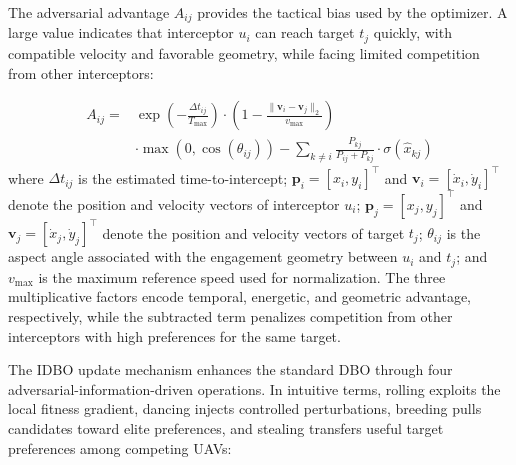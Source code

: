 \documentclass[lettersize,journal]{IEEEtran}
\begin{document}
The adversarial advantage $A_{ij}$ provides the tactical bias used by the optimizer. A large value indicates that interceptor $u_i$ can reach target $t_j$ quickly, with compatible velocity and favorable geometry, while facing limited competition from other interceptors:

\begin{equation}
\label{eq:adversarial_advantage}
\begin{split}
A_{ij} =& \exp\left(-\frac{\Delta t_{ij}}{T_{\max}}\right) \cdot \left(1 - \frac{\|\mathbf{v}_i - \mathbf{v}_j\|_2}{v_{\max}}\right) \\
&\cdot \max\left(0, \cos(\theta_{ij})\right) - \sum_{k\neq i} \frac{P_{kj}}{P_{ij} + P_{kj}} \cdot \sigma(\hat{x}_{kj})
\end{split}
\end{equation}
where $\Delta t_{ij}$ is the estimated time-to-intercept; $\mathbf{p}_i=[x_i, y_i]^\top$ and $\mathbf{v}_i=[\dot{x}_i, \dot{y}_i]^\top$ denote the position and velocity vectors of interceptor $u_i$; $\mathbf{p}_j=[x_j, y_j]^\top$ and $\mathbf{v}_j=[\dot{x}_j, \dot{y}_j]^\top$ denote the position and velocity vectors of target $t_j$; $\theta_{ij}$ is the aspect angle associated with the engagement geometry between $u_i$ and $t_j$; and $v_{\max}$ is the maximum reference speed used for normalization. The three multiplicative factors encode temporal, energetic, and geometric advantage, respectively, while the subtracted term penalizes competition from other interceptors with high preferences for the same target.

The IDBO update mechanism enhances the standard DBO through four adversarial-information-driven operations. In intuitive terms, rolling exploits the local fitness gradient, dancing injects controlled perturbations, breeding pulls candidates toward elite preferences, and stealing transfers useful target preferences among competing UAVs:
\end{document}
